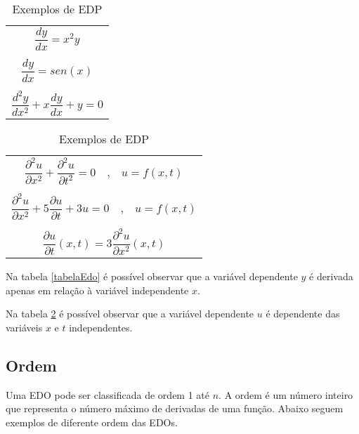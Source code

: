 \begin{table}[h!]
\parbox{.40\linewidth}{
\centering
\begin{tabular}{c}
\hline 
  $
\dfrac{dy}{dx} = x^2y
$
  \\  \\
  
$
\dfrac{dy}{dx} = sen(x)
$

 \\ \\
  
$
\dfrac{d^2y}{dx^2} + x \dfrac{dy}{dx} + y = 0
$  \\

\hline
\end{tabular}
\caption{Exemplos de EDO}
\label{tabelaEdo}
}
\hfill
\parbox{.50\linewidth}{
\centering
\begin{tabular}{c}
\toprule

$
\dfrac{\partial ^2u}{\partial x^2} + \dfrac{\partial ^2u}{\partial t^2} = 0  \quad \textrm{,} \quad  u = f(x,t)
$

 \\ \\
$
\dfrac{\partial^2u}{\partial x^2} + 5 \dfrac{\partial u}{\partial t} + 3u = 0 \quad \textrm{,} \quad   u = f(x,t)
$

 \\ \\ 
 $ \dfrac{\partial u}{\partial t}(x,t) = 3 \dfrac{\partial^2u}{\partial x^2}(x,t) $  
 \\

\bottomrule
\end{tabular}
\caption{Exemplos de EDP}
\label{tabelaEDP}
}
\end{table}

Na tabela \ref{tabelaEdo} é possível observar que a variável dependente $y$ é derivada apenas em relação à variável independente $x$.

Na tabela \ref{tabelaEDP} é possível observar que a variável dependente $u$ é dependente das variáveis $x$ e $t$ independentes.


\subsection[Ordem]{Ordem}

Uma EDO pode ser classificada de ordem 1 até $n$. A ordem é um número inteiro que representa o número máximo de derivadas de uma função. Abaixo seguem exemplos de diferente ordem das EDOs. 

